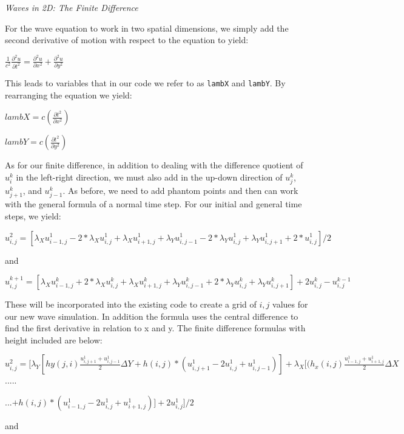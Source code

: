 \documentclass[12pt]{article}
\begin{document}
\begin{enumerate}
{\large{\item\textit{Waves in 2D: The Finite Difference}}

\normalsize{For the wave equation to work in two spatial dimensions, we simply add the second derivative of motion with respect to the equation to yield: }\newline

\centerline{\large{$\frac{1}{c^2} \frac{\partial^2 u}{\partial t^2} = \frac{\partial^2 u}{\partial x^2} + \frac{\partial^2 u}{\partial y^2}$}}

This leads to variables that in our code we refer to as \texttt{lambX} and \texttt{lambY}.  By rearranging the equation we yield:

\centerline{$lambX = c(\frac{\partial t^2}{\partial x^2})$}

\centerline{$lambY = c(\frac{\partial t^2}{\partial y^2})$}

As for our finite difference, in addition to dealing with the difference quotient of $u_i^{k}$ in the left-right direction, we must also add in the up-down direction of $u_j^k$, $u_{j+1}^k$, and $u_{j-1}^k$.  As before, we need to add phantom points and then can work with the general formula of a normal time step.  For our initial and general time steps, we yield:\newline

\centerline{
$u_{i,j}^{2} = [\lambda_X u_{i-1,j}^1 - 2*\lambda_X u_{i,j}^1 + \lambda_X u_{i+1,j}^1 + \lambda_Y u_{i,j-1}^1 - 2*\lambda_Y u_{i,j}^1 + \lambda_Y u_{i,j+1}^1 + 2*u_{i,j}^1]/2$
}

and\newline

\centerline{
$u_{i,j}^{k+1} = [\lambda_X u_{i-1,j}^k + 2*\lambda_X u_{i,j}^k + \lambda_X u_{i+1,j}^k + \lambda_Y u_{i,j-1}^k + 2*\lambda_Y u_{i,j}^k + \lambda_Y u_{i,j+1}^k] + 2 u_{i,j}^k - u_{i,j}^{k-1}$
}

These will be incorporated into the existing code to create a grid of $i,j$ values for our new wave simulation. In addition the formula uses the central difference to find the first derivative in relation to x and y. The finite difference formulas with height included are below:

\centerline{
$u_{i,j}^{2} = [\lambda_Y[ hy(j,i)\frac{u_{i,j+1}^1+u_{i,j-1}^1}{2}\Delta Y + h(i,j)*(u_{i,j+1}^1 - 2u_{i,j}^1 + u_{i,j-1}^1)] + \lambda_X[(h_x(i,j) \frac{u_{i-1,j}^1 + u_{i+1,j}^1}{2}\Delta X$.....}

\centerline{...$+ h(i,j)*(u_{i-1,j}^1 - 2u_{i,j}^1 + u_{i+1,j}^1)] + 2 u_{i,j}^1]/2$
}
and\newline 
}
\end{enumerate}
\end{document}

